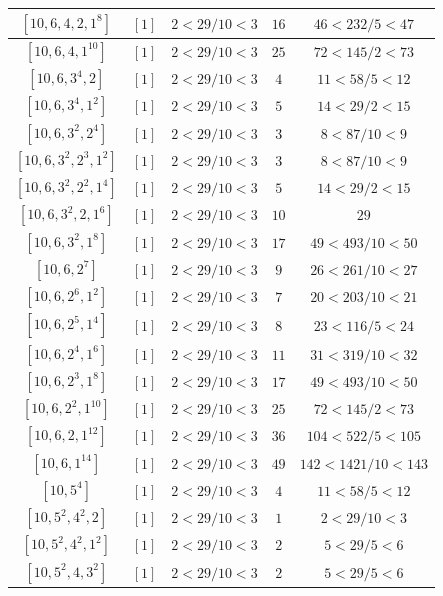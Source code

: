 \documentclass{article}%
\begin{document}
\begin{center}
\begin{longtable}{||c|c|c|c|c||}
$[10, 6, 4, 2, 1^{8}]$ & $[1]$ & $2 < 29/10 < 3$ & $16$ & $46 < 232/5 < 47$ \\ \hline 
$[10, 6, 4, 1^{10}]$ & $[1]$ & $2 < 29/10 < 3$ & $25$ & $72 < 145/2 < 73$ \\ \hline 
$[10, 6, 3^{4}, 2]$ & $[1]$ & $2 < 29/10 < 3$ & $4$ & $11 < 58/5 < 12$ \\ \hline 
$[10, 6, 3^{4}, 1^{2}]$ & $[1]$ & $2 < 29/10 < 3$ & $5$ & $14 < 29/2 < 15$ \\ \hline 
$[10, 6, 3^{2}, 2^{4}]$ & $[1]$ & $2 < 29/10 < 3$ & $3$ & $8 < 87/10 < 9$ \\ \hline 
$[10, 6, 3^{2}, 2^{3}, 1^{2}]$ & $[1]$ & $2 < 29/10 < 3$ & $3$ & $8 < 87/10 < 9$ \\ \hline 
$[10, 6, 3^{2}, 2^{2}, 1^{4}]$ & $[1]$ & $2 < 29/10 < 3$ & $5$ & $14 < 29/2 < 15$ \\ \hline 
$[10, 6, 3^{2}, 2, 1^{6}]$ & $[1]$ & $2 < 29/10 < 3$ & $10$ & $29$ \\ \hline 
$[10, 6, 3^{2}, 1^{8}]$ & $[1]$ & $2 < 29/10 < 3$ & $17$ & $49 < 493/10 < 50$ \\ \hline 
$[10, 6, 2^{7}]$ & $[1]$ & $2 < 29/10 < 3$ & $9$ & $26 < 261/10 < 27$ \\ \hline 
$[10, 6, 2^{6}, 1^{2}]$ & $[1]$ & $2 < 29/10 < 3$ & $7$ & $20 < 203/10 < 21$ \\ \hline 
$[10, 6, 2^{5}, 1^{4}]$ & $[1]$ & $2 < 29/10 < 3$ & $8$ & $23 < 116/5 < 24$ \\ \hline 
$[10, 6, 2^{4}, 1^{6}]$ & $[1]$ & $2 < 29/10 < 3$ & $11$ & $31 < 319/10 < 32$ \\ \hline 
$[10, 6, 2^{3}, 1^{8}]$ & $[1]$ & $2 < 29/10 < 3$ & $17$ & $49 < 493/10 < 50$ \\ \hline 
$[10, 6, 2^{2}, 1^{10}]$ & $[1]$ & $2 < 29/10 < 3$ & $25$ & $72 < 145/2 < 73$ \\ \hline 
$[10, 6, 2, 1^{12}]$ & $[1]$ & $2 < 29/10 < 3$ & $36$ & $104 < 522/5 < 105$ \\ \hline 
$[10, 6, 1^{14}]$ & $[1]$ & $2 < 29/10 < 3$ & $49$ & $142 < 1421/10 < 143$ \\ \hline 
$[10, 5^{4}]$ & $[1]$ & $2 < 29/10 < 3$ & $4$ & $11 < 58/5 < 12$ \\ \hline 
$[10, 5^{2}, 4^{2}, 2]$ & $[1]$ & $2 < 29/10 < 3$ & $1$ & $2 < 29/10 < 3$ \\ \hline 
$[10, 5^{2}, 4^{2}, 1^{2}]$ & $[1]$ & $2 < 29/10 < 3$ & $2$ & $5 < 29/5 < 6$ \\ \hline 
$[10, 5^{2}, 4, 3^{2}]$ & $[1]$ & $2 < 29/10 < 3$ & $2$ & $5 < 29/5 < 6$ \\ \hline 

\end{longtable}
\end{center}
\end{document}
